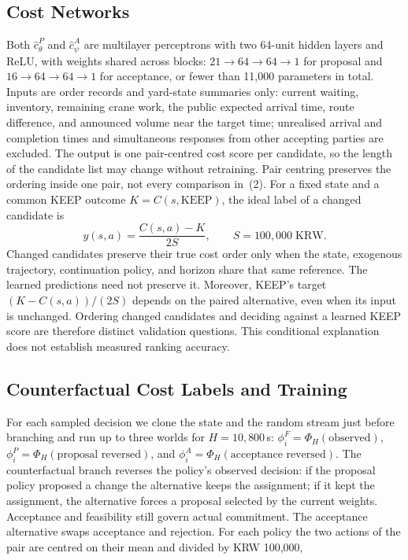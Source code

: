 \documentclass[a4paper]{llncs}
\begin{document}
\subsection{Cost Networks}
\label{sec:arch-models}
Both $\hat c^{P}_{\theta}$ and $\hat c^{A}_{\psi}$ are multilayer
perceptrons with two 64-unit hidden layers and ReLU, with weights shared
across blocks: $21\to64\to64\to1$ for proposal and $16\to64\to64\to1$
for acceptance, or fewer than 11{,}000 parameters in total. Inputs
are order records and yard-state summaries only: current waiting,
inventory, remaining crane work, the public expected arrival time, route
difference, and announced volume near the target time; unrealised arrival
and completion times and simultaneous responses from other accepting
parties are excluded. The output is one
pair-centred cost score per candidate, so the length of the candidate
list may change without retraining. Pair centring preserves the ordering
inside one pair, not every comparison in~(2).
For a fixed state and a common KEEP outcome $K=C(s,\mathrm{KEEP})$,
the ideal label of a changed candidate is
\begin{equation}
y(s,a)=\frac{C(s,a)-K}{2S},\qquad S=100{,}000\;\mathrm{KRW}.
\end{equation}
Changed candidates preserve their true cost order only when the state,
exogenous trajectory, continuation policy, and horizon share that same
reference. The learned predictions need not preserve it. Moreover,
KEEP's target $(K-C(s,a))/(2S)$ depends on the paired alternative,
even when its input is unchanged. Ordering changed candidates and
deciding against a learned KEEP score are therefore distinct validation
questions. This conditional explanation does not establish measured
ranking accuracy.

\subsection{Counterfactual Cost Labels and Training}
\label{sec:arch-labels}
For each sampled decision we clone the state and the random stream just
before branching and run up to three worlds for $H=10{,}800$\,s:
$\phi_i^F=\Phi_H(\text{observed})$,
$\phi_i^P=\Phi_H(\text{proposal reversed})$, and
$\phi_i^A=\Phi_H(\text{acceptance reversed})$. The counterfactual branch
reverses the policy's observed decision: if the proposal policy proposed
a change the alternative keeps the assignment; if it kept the assignment,
the alternative forces a proposal selected by the current weights.
Acceptance and feasibility still govern actual commitment. The acceptance
alternative swaps acceptance and rejection.
For each policy the two actions of the pair are centred on their mean
and divided by KRW 100{,}000,
\end{document}
